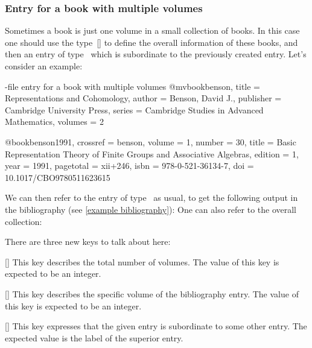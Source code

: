\subsubsection{Entry for a book with multiple volumes}

Sometimes a book is just one volume in a small collection of books.
In this case one should use the type~[\atname] to define the overall information of these books, and then an entry of type~ which is subordinate to the previously created entry.
Let’s consider an example:
\begin{showcode}[label = {bib entry multiple volume book}]{-file entry for a book with multiple volumes}
@mvbook{benson,
  title     = {Representations and Cohomology},
  author    = {Benson, David J.},
  publisher = {Cambridge University Press},
  series    = {Cambridge Studies in Advanced Mathematics},
  volumes   = {2}
}

@book{benson1991,
  crossref  = {benson},
  volume    = {1},
  number    = {30},
  title     = {Basic Representation Theory of Finite Groups and Associative Algebras},
  edition   = {1},
  year      = {1991},
  pagetotal = {xii+246},
  isbn      = {978-0-521-36134-7},
  doi       = {10.1017/CBO9780511623615}
}
\end{showcode}
We can then refer to the entry of type~ as usual, to get the following output in the bibliography (see \cref{example bibliography}):
One can also refer to the overall collection:

There are three new keys to talk about here:
\begin{mydescription}
  \item[\optname{volumes}]
    [\optname]
    This key describes the total number of volumes.
    The value of this key is expected to be an integer.
  \item[\optname{volume}]
    [\optname]
    This key describes the specific volume of the bibliography entry.
    The value of this key is expected to be an integer.
  \item[\optname{crossref}]
  [\optname]
    This key expresses that the given entry is subordinate to some other entry.
    The expected value is the label of the superior entry.
\end{mydescription}

